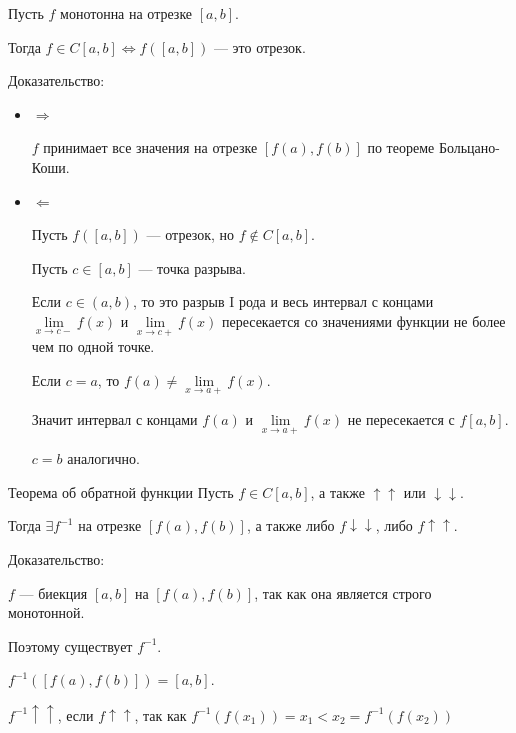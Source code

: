 \begin{thrm}{}{}
    Пусть \( f \) монотонна на отрезке \( [a, b] \).

    Тогда \( f \in C[a, b] \Leftrightarrow f([a, b]) \) --- это отрезок.
\end{thrm}

Доказательство:
\begin{itemize}
    \item
        \( \Rightarrow \)

        \( f \) принимает все значения на отрезке \( [f(a), f(b)] \) по теореме Больцано-Коши.
    \item
        \( \Leftarrow \)

        Пусть \( f([a, b]) \) --- отрезок, но \( f \notin C[a, b] \).

        Пусть \( c \in [a, b] \) --- точка разрыва.

        Если \( c \in (a, b) \), то это разрыв I рода
        и весь интервал с концами \( \lim\limits_{x \to c-} f(x) \) и \( \lim\limits_{x \to c+} f(x) \)
        пересекается со значениями функции не более чем по одной точке.

        Если \( c = a \), то \( f(a) \neq \lim\limits_{x \to a+} f(x) \).

        Значит интервал с концами \( f(a) \) и \( \lim\limits_{x \to a+} f(x) \) 
        не пересекается с \( f[a, b] \).

        \( c = b \) аналогично.
\end{itemize}

\begin{thrm}{Теорема об обратной функции}{}
    Пусть \( f \in C[a, b] \), а также \( \uparrow \uparrow \) или \( \downarrow \downarrow \).

    Тогда \( \exists f^{-1} \) на отрезке \( [f(a), f(b)] \),
    а также либо \( f \downarrow \downarrow \), либо \( f \uparrow \uparrow \).
\end{thrm}

Доказательство:

\( f \) --- биекция \( [a, b] \) на \( [f(a), f(b)] \),
так как она является строго монотонной.

Поэтому существует \( f^{-1} \).

\( f^{-1} ( [f(a), f(b)] ) = [a, b] \).

\( f^{-1} \uparrow \uparrow \), если \( f \uparrow \uparrow \), так как
\( f^{-1} ( f(x_1) ) = x_1 < x_2 = f^{-1} ( f(x_2) ) \)
